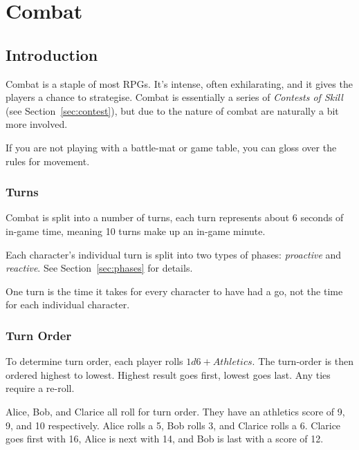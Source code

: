 \chapter{Combat}\label{chap:combat}
\section{Introduction}
Combat is a staple of most RPGs. 
It's intense, often exhilarating, and it gives the players a chance to strategise.
Combat is essentially a series of \textit{Contests of Skill} (see Section~\ref{sec:contest}), but due to the nature of combat are naturally a bit more involved.

\begin{note} 
    If you are not playing with a battle-mat or game table, you can gloss over the rules for movement.
\end{note}

\subsection{Turns}
Combat is split into a number of turns, each turn represents about 6 seconds of in-game time, meaning 10 turns make up an in-game minute.

Each character's individual turn is split into two types of phases: \textit{proactive} and \textit{reactive}.
See Section~\ref{sec:phases} for details.

\begin{note} 
    One turn is the time it takes for every character to have had a go, not the time for each individual character.
\end{note}

\subsection{Turn Order}
To determine turn order, each player rolls $1d6 + \mathit{Athletics}$. 
The turn-order is then ordered highest to lowest. 
Highest result goes first, lowest goes last. 
Any ties require a re-roll.

\begin{example} 
    Alice, Bob, and Clarice all roll for turn order. 
    They have an athletics score of 9, 9, and 10 respectively. 
    Alice rolls a 5, Bob rolls 3, and Clarice rolls a 6. 
    Clarice goes first with 16, Alice is next with 14, and Bob is last with a score of 12.
\end{example}

